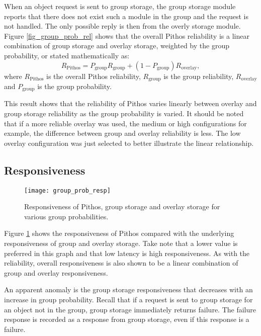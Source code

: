 When an object request is sent to group storage, the group storage module reports that there does not exist such a module in the group and the request is not handled. The only possible reply is then from the overly storage module. Figure \ref{fig_group_prob_rel} shows that the overall Pithos reliability is a linear combination of group storage and overlay storage, weighted by the group probability, or stated mathematically as:
%
\begin{equation}
R_{\textrm{Pithos}} = P_{\textrm{group}}R_{\textrm{group}} + (1-P_{\textrm{group}})R_{\textrm{overlay}},
\end{equation}
%
where $R_{\textrm{Pithos}}$ is the overall Pithos reliability, $R_{\textrm{group}}$ is the group reliability, $R_{\textrm{overlay}}$ and $P_{\textrm{group}}$ is the group probability.

This result shows that the reliability of Pithos varies linearly between overlay and group storage reliability as the group probability is varied. It should be noted that if a more reliable overlay was used, the medium or high configurations for example, the difference between group and overlay reliability is less. The low overlay configuration was just selected to better illustrate the linear relationship.

\subsection{Responsiveness}

\begin{figure}[htbp]
 \centering
 \texttt{[image: group\_prob\_resp]}
 \caption{Responsiveness of Pithos, group storage and overlay storage for various group probabilities.}
 \label{fig_group_prob_resp}
\end{figure}
%
Figure \ref{fig_group_prob_resp} shows the responsiveness of Pithos compared with the underlying responsiveness of group and overlay storage. Take note that a lower value is preferred in this graph and that low latency is high responsiveness. As with the reliability, overall responsiveness is also shown to be a linear combination of group and overlay responsiveness.

An apparent anomaly is the group storage responsiveness that decreases with an increase in group probability. Recall that if a request is sent to group storage for an object not in the group, group storage immediately returns failure. The failure response is recorded as a response from group storage, even if this response is a failure.

